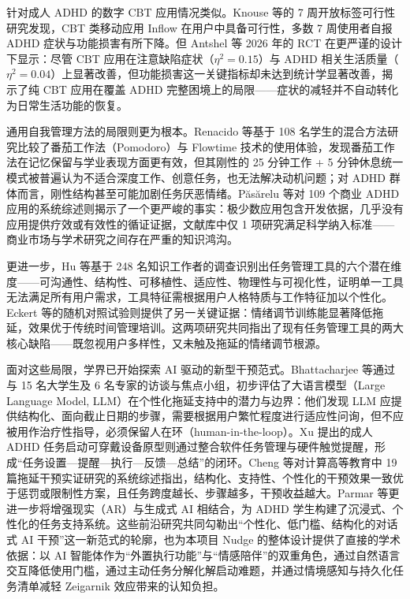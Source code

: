 \par 针对成人 ADHD 的数字 CBT 应用情况类似。Knouse 等的 7 周开放标签可行性研究发现，CBT 类移动应用 Inflow 在用户中具备可行性，多数 7 周使用者自报 ADHD 症状与功能损害有所下降\cite{knouse2022inflow}。但 Antshel 等 2026 年的 RCT 在更严谨的设计下显示：尽管 CBT 应用在注意缺陷症状（$\eta^2=0.15$）与 ADHD 相关生活质量（$\eta^2=0.04$）上显著改善，但功能损害这一关键指标却未达到统计学显著改善\cite{antshel2026digital}，揭示了纯 CBT 应用在覆盖 ADHD 完整困境上的局限——症状的减轻并不自动转化为日常生活功能的恢复。

\par 通用自我管理方法的局限则更为根本。Renacido 等基于 108 名学生的混合方法研究比较了番茄工作法（Pomodoro）与 Flowtime 技术的使用体验，发现番茄工作法在记忆保留与学业表现方面更有效，但其刚性的 25 分钟工作 + 5 分钟休息统一模式被普遍认为不适合深度工作、创意任务，也无法解决动机问题；对 ADHD 群体而言，刚性结构甚至可能加剧任务厌恶情绪\cite{renacido2025comparative}。Păsărelu 等对 109 个商业 ADHD 应用的系统综述则揭示了一个更严峻的事实：极少数应用包含开发依据，几乎没有应用提供疗效或有效性的循证证据，文献库中仅 1 项研究满足科学纳入标准\cite{pasarelu2020attention}——商业市场与学术研究之间存在严重的知识鸿沟。

\par 更进一步，Hu 等基于 248 名知识工作者的调查识别出任务管理工具的六个潜在维度——可沟通性、结构性、可移植性、适应性、物理性与可视化性，证明单一工具无法满足所有用户需求，工具特征需根据用户人格特质与工作特征加以个性化\cite{hu2024unpacking}。Eckert 等的随机对照试验则提供了另一关键证据：情绪调节训练能显著降低拖延，效果优于传统时间管理培训\cite{eckert2016overcome}。这两项研究共同指出了现有任务管理工具的两大核心缺陷——既忽视用户多样性，又未触及拖延的情绪调节根源。

\par 面对这些局限，学界已开始探索 AI 驱动的新型干预范式。Bhattacharjee 等通过与 15 名大学生及 6 名专家的访谈与焦点小组，初步评估了大语言模型（Large Language Model, LLM）在个性化拖延支持中的潜力与边界：他们发现 LLM 应提供结构化、面向截止日期的步骤，需要根据用户繁忙程度进行适应性问询，但不应被用作治疗性指导，必须保留人在环（human-in-the-loop）\cite{bhattacharjee2023large}。Xu 提出的成人 ADHD 任务启动可穿戴设备原型则通过整合软件任务管理与硬件触觉提醒，形成``任务设置—提醒—执行—反馈—总结''的闭环\cite{xu2026task}。Cheng 等对计算高等教育中 19 篇拖延干预实证研究的系统综述指出，结构化、支持性、个性化的干预效果一致优于惩罚或限制性方案，且任务跨度越长、步骤越多，干预收益越大\cite{cheng2026procrastination}。Parmar 等更进一步将增强现实（AR）与生成式 AI 相结合，为 ADHD 学生构建了沉浸式、个性化的任务支持系统\cite{parmar2026user}。这些前沿研究共同勾勒出``个性化、低门槛、结构化的对话式 AI 干预''这一新范式的轮廓，也为本项目 Nudge 的整体设计提供了直接的学术依据：以 AI 智能体作为``外置执行功能''与``情感陪伴''的双重角色，通过自然语言交互降低使用门槛，通过主动任务分解化解启动难题，并通过情境感知与持久化任务清单减轻 Zeigarnik 效应带来的认知负担。

